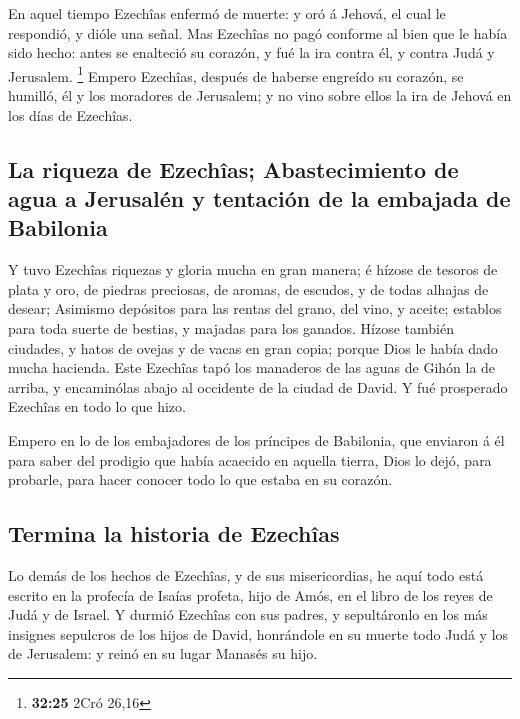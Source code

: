  En aquel tiempo Ezechîas enfermó de muerte: y oró á
Jehová, el cual le respondió, y dióle una señal.  Mas
Ezechîas no pagó conforme al bien que le había sido hecho: antes se
enalteció su corazón, y fué la ira contra él, y contra Judá y Jerusalem.
\footnote{\textbf{32:25} 2Cró 26,16}  Empero Ezechîas,
después de haberse engreído su corazón, se humilló, él y los moradores
de Jerusalem; y no vino sobre ellos la ira de Jehová en los días de
Ezechîas.

\hypertarget{la-riqueza-de-ezechuxeeas-abastecimiento-de-agua-a-jerusaluxe9n-y-tentaciuxf3n-de-la-embajada-de-babilonia}{%
\subsection{La riqueza de Ezechîas; Abastecimiento de agua a Jerusalén y
tentación de la embajada de
Babilonia}\label{la-riqueza-de-ezechuxeeas-abastecimiento-de-agua-a-jerusaluxe9n-y-tentaciuxf3n-de-la-embajada-de-babilonia}}

 Y tuvo Ezechîas riquezas y gloria mucha en gran manera;
é hízose de tesoros de plata y oro, de piedras preciosas, de aromas, de
escudos, y de todas alhajas de desear;  Asimismo
depósitos para las rentas del grano, del vino, y aceite; establos para
toda suerte de bestias, y majadas para los ganados. 
Hízose también ciudades, y hatos de ovejas y de vacas en gran copia;
porque Dios le había dado mucha hacienda.  Este Ezechîas
tapó los manaderos de las aguas de Gihón la de arriba, y encaminólas
abajo al occidente de la ciudad de David. Y fué prosperado Ezechîas en
todo lo que hizo.

 Empero en lo de los embajadores de los príncipes de
Babilonia, que enviaron á él para saber del prodigio que había acaecido
en aquella tierra, Dios lo dejó, para probarle, para hacer conocer todo
lo que estaba en su corazón.

\hypertarget{termina-la-historia-de-ezechuxeeas}{%
\subsection{Termina la historia de
Ezechîas}\label{termina-la-historia-de-ezechuxeeas}}

 Lo demás de los hechos de Ezechîas, y de sus
misericordias, he aquí todo está escrito en la profecía de Isaías
profeta, hijo de Amós, en el libro de los reyes de Judá y de Israel.
 Y durmió Ezechîas con sus padres, y sepultáronlo en los
más insignes sepulcros de los hijos de David, honrándole en su muerte
todo Judá y los de Jerusalem: y reinó en su lugar Manasés su hijo.


